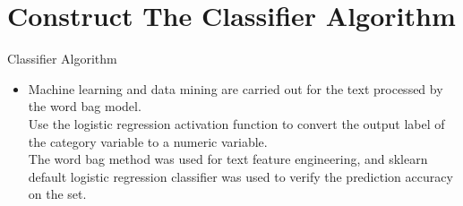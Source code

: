 \documentclass[
 size=14pt,
 paper=smartboard,  %
 mode=present, 		%
 display=slides, 	%
 style=tuliplab,  	%
 pauseslide,
 fleqn,leqno]{powerdot}
\begin{document}
\section{Construct The Classifier Algorithm}


\begin{slide}{Classifier Algorithm}
  \begin{itemize}
    \item  
    Machine learning and data mining are carried out for the text processed by the word bag model.
    \\Use the logistic regression activation function to convert the output label of the category variable to a numeric variable.
   \\ The word bag method was used for text feature engineering, and sklearn default logistic regression classifier was used to verify the prediction accuracy on the set.
  \end{itemize}
  
\end{slide}

  
\end{document}
